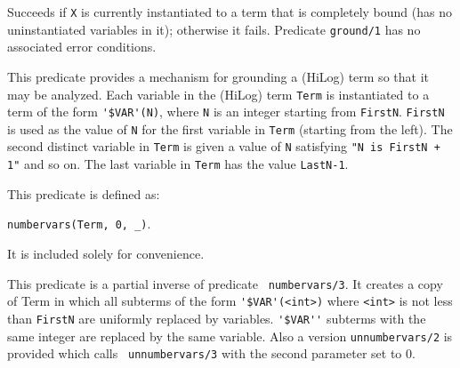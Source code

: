 \begin{description}
    Succeeds if {\tt X} is currently instantiated to a term that is 
    completely bound (has no uninstantiated variables in it); 
    otherwise it fails.  Predicate {\tt ground/1} has no associated 
    error conditions.

    This predicate provides a mechanism for grounding a (HiLog) term
    so that it may be analyzed.  Each variable in the (HiLog) term
    {\tt Term} is instantiated to a term of the form \verb|'$VAR'(N)|,
    where {\tt N} is an integer starting from {\tt FirstN}.  
    {\tt FirstN} is used as the value of {\tt N} for the first
    variable in {\tt Term} (starting from the left). The second distinct
    variable in {\tt Term} is given a value of {\tt N} satisfying
    {\tt "N is FirstN + 1"} and so on.  The last variable in {\tt Term}
    has the value {\tt LastN-1}.

    This predicate is defined as:
    \begin{center}
    {\tt   numbervars(Term, 0, \_)}.
    \end{center}
    It is included solely for convenience.


    This predicate is a partial inverse of predicate {\tt
    numbervars/3}.  It creates a copy of Term in which all subterms of
    the form \verb|'$VAR'(<int>)| where \verb|<int>| is not less than
    {\tt FirstN} are uniformly replaced by variables.  \verb|'$VAR''|
    subterms with the same integer are replaced by the same variable.
    Also a version {\tt unnumbervars/2} is provided which calls {\tt
    unnumbervars/3} with the second parameter set to 0.


\end{description}
